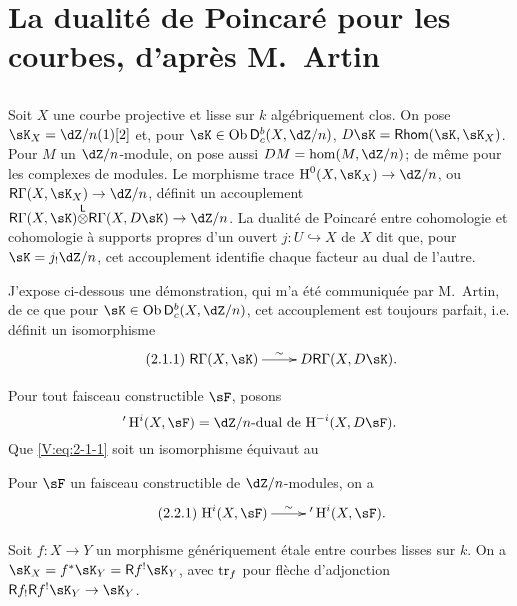 \section{La dualité de Poincaré pour les courbes, d'après M.\ Artin}\label{V:2}





\subsection{}\label{V:2-1}

Soit $X$ une courbe projective et lisse sur $k$ algébriquement clos. On pose 
$\sK_X=\dZ/n(1)[2]$ et, pour $\sK\in\ob \D_c^b(X,\dZ/n)$, 
$D\sK=\rHom(\sK,\sK_X)$. Pour $M$ un $\dZ/n$-module, on pose aussi 
$D M = \hom(M,\dZ/n)$; de même pour les complexes de modules. Le morphisme 
trace $\h^0(X,\sK_X) \to \dZ/n$, ou $\R\Gamma(X,\sK_X)\to \dZ/n$, définit un 
accouplement $\R\Gamma(X,\sK)\lotimes\R\Gamma(X,D\sK) \to \dZ/n$. La dualité 
de Poincaré entre cohomologie et cohomologie à supports propres d'un ouvert 
$j:U\hookrightarrow X$ de $X$ dit que, pour $\sK=j_!\dZ/n$, cet accouplement 
identifie chaque facteur au dual de l'autre. 

J'expose ci-dessous une démonstration, qui m'a été communiquée par 
M.\ Artin, de ce que pour $\sK\in\ob\D_c^b(X,\dZ/n)$, cet accouplement est 
toujours parfait, i.e. définit un isomorphisme
\begin{equation*}\tag{2.1.1}\label{V:eq:2-1-1}
\xymatrix{
  \R\Gamma(X,\sK) \ar[r]^-\sim 
    & D \R\Gamma(X,D\sK) \text{.}
}
\end{equation*}

Pour tout faisceau constructible $\sF$, posons 
\[
  '\h^i(X,\sF) = \text{$\dZ/n$-dual de $\h^{-i}(X,D\sF)$.}
\]
Que \eqref{V:eq:2-1-1} soit un isomorphisme équivaut au 





\begin{theorem_}\label{V:2-2}
Pour $\sF$ un faisceau constructible de $\dZ/n$-modules, on a 
\begin{equation*}\tag{2.2.1}\label{V:eq:2-2-1}
\xymatrix{
  \h^i(X,\sF) \ar[r]^-\sim 
    & '\h^i(X,\sF) \text{.}
}
\end{equation*}
\end{theorem_}





\begin{lemma_}\label{V:2-3}
Soit $f:X\to Y$ un morphisme génériquement étale entre courbes lisses sur 
$k$. On a $\sK_X=f^\ast\sK_Y=\R f^!\sK_Y$, avec $\operatorname{tr}_f$ pour flèche 
d'adjonction $\R f_!\R f^!\sK_Y\to \sK_Y$.
\end{lemma_}

